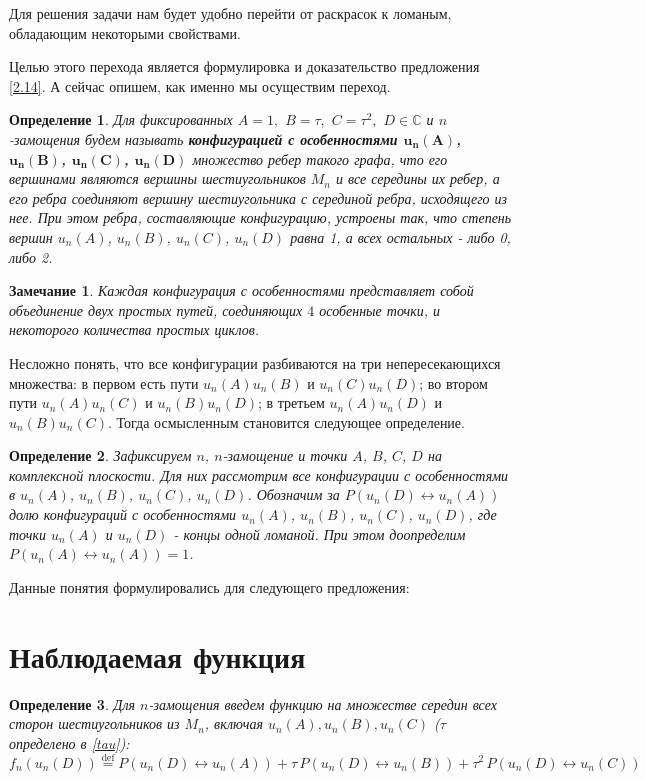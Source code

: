 \documentclass[russian,12pt]{article}
\newtheorem{definition}{Определение}
\newtheorem{note}{Замечание}
\newcommand*{\defeq}{\stackrel{\text{def}}{=}}
\begin{document}
Для решения задачи нам будет удобно перейти от раскрасок к ломаным, обладающим некоторыми свойствами. 

Целью этого перехода является формулировка и доказательство предложения \ref{2.14}. А сейчас опишем, как именно мы осуществим переход.
\begin{definition}
Для фиксированных $A = 1,$ $B = \tau,$ $C = \tau^2,$ $D \in \mathbb{C}$ и $n$-замощения будем называть \textbf{конфигурацией с особенностями $\boldsymbol{u_n(A)}$, $\boldsymbol{u_n(B)}$, $\boldsymbol{u_n(C)}$, $\boldsymbol{u_n(D)}$} множество ребер такого графа, что его вершинами являются вершины шестиугольников $M_n$ и все середины их ребер,
а его ребра соединяют вершину шестиугольника с серединой ребра, исходящего из нее. При этом ребра, составляющие конфигурацию, устроены так, что степень вершин  $u_n(A)$, $u_n(B)$, $u_n(C)$, $u_n(D)$ равна 1, а всех остальных - либо 0, либо 2.
\end{definition}
\begin{note}
Каждая конфигурация с особенностями представляет собой объединение двух простых путей, соединяющих $4$ особенные точки, и некоторого количества простых циклов.
\end{note}

Несложно понять, что все конфигурации разбиваются на три непересекающихся множества: в первом есть пути $u_n(A)u_n(B)$ и $u_n(C)u_n(D)$; во втором пути $u_n(A)u_n(C)$ и $u_n(B)u_n(D)$; в третьем $u_n(A)u_n(D)$ и $u_n(B)u_n(C)$. Тогда осмысленным становится следующее определение.

\begin{definition}
Зафиксируем $n$, $n$-замощение и точки $A$, $B$, $C$, $D$ на комплексной плоскости. Для них рассмотрим все конфигурации с особенностями в $u_n(A)$, $u_n(B)$, $u_n(C)$, $u_n(D)$. Обозначим за $P(u_n(D)\leftrightarrow u_n(A))$ долю конфигураций с особенностями $u_n(A)$, $u_n(B)$, $u_n(C)$, $u_n(D)$, где точки $u_n(A)$ и $u_n(D)$ - концы одной ломаной. При этом доопределим $P(u_n(A)\leftrightarrow u_n(A)) = 1$.
\end{definition}

Данные понятия формулировались для следующего предложения:



\section*{Наблюдаемая функция}

\begin{definition}
Для $n$-замощения введем функцию на множестве  середин всех сторон шестиугольников из $M_n$, включая $u_n(A),u_n(B),u_n(C)$ ($\tau$ определено в \ref{tau}):
$$
f_n(u_n(D)) \defeq P(u_n(D)\leftrightarrow u_n(A))
+\tau\,P(u_n(D)\leftrightarrow u_n(B)) +\tau^2\,P(u_n(D)\leftrightarrow u_n(C))
$$

\end{definition}
\end{document}

